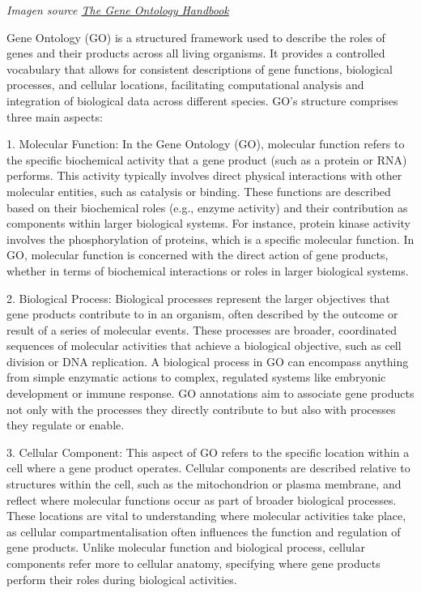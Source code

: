 \documentclass[
]{book}
\begin{document}
\emph{Imagen source \href{https://link.springer.com/book/10.1007/978-1-4939-3743-1}{The Gene Ontology Handbook}}

Gene Ontology (GO) is a structured framework used to describe the roles of genes and their products across all living organisms. It provides a controlled vocabulary that allows for consistent descriptions of gene functions, biological processes, and cellular locations, facilitating computational analysis and integration of biological data across different species. GO's structure comprises three main aspects:

{1. Molecular Function:}
In the Gene Ontology (GO), molecular function refers to the specific biochemical activity that a gene product (such as a protein or RNA) performs. This activity typically involves direct physical interactions with other molecular entities, such as catalysis or binding. These functions are described based on their biochemical roles (e.g., enzyme activity) and their contribution as components within larger biological systems. For instance, protein kinase activity involves the phosphorylation of proteins, which is a specific molecular function. In GO, molecular function is concerned with the direct action of gene products, whether in terms of biochemical interactions or roles in larger biological systems.

{2. Biological Process:}
Biological processes represent the larger objectives that gene products contribute to in an organism, often described by the outcome or result of a series of molecular events. These processes are broader, coordinated sequences of molecular activities that achieve a biological objective, such as cell division or DNA replication. A biological process in GO can encompass anything from simple enzymatic actions to complex, regulated systems like embryonic development or immune response. GO annotations aim to associate gene products not only with the processes they directly contribute to but also with processes they regulate or enable.

{3. Cellular Component:}
This aspect of GO refers to the specific location within a cell where a gene product operates. Cellular components are described relative to structures within the cell, such as the mitochondrion or plasma membrane, and reflect where molecular functions occur as part of broader biological processes. These locations are vital to understanding where molecular activities take place, as cellular compartmentalisation often influences the function and regulation of gene products. Unlike molecular function and biological process, cellular components refer more to cellular anatomy, specifying where gene products perform their roles during biological activities.
\end{document}
